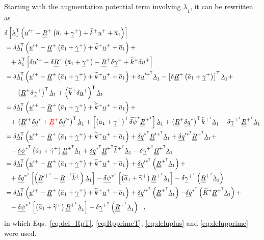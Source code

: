 \documentclass[12pt,a4paper,oneside,english]{abntex2} %
\newcommand{\fix}[1]{{\color{red}#1}}
\newcommand{\vect}[1]{\underline{#1}}
\newcommand{\uvec}[1]{\overline{#1}}
\def\tens#1{\underline{\underline{#1}}}
\def\til#1{\widetilde{#1}}
\def\lb{\left[}
\def\rb{\right]}
\def\lp{\left(}
\def\rp{\right)}
\def\T{\mathsf{T}}
\def\aone{\uvec{a}_1}
\def\aonetil{\til{a}_1}
\def\R{\tens{R}}
\def\Rp{\R^+}
\def\RpT{\R^{+^\T}}
\def\Rpprime{\R^{\prime +}}
\def\RpprimeT{\R^{{\prime +}^\T}}
\def\u{\vect{u}}
\def\uplus{\u^{+}}
\def\upprime{\u^{\prime+}}
\def\upprimeT{\u^{\prime+^\T}}
\def\gam{\vect{\gamma}}
\def\gamp{\gam^{+}}
\def\gampT{\gam^{+^\T}}
\def\gamptil{\til{\gamma}^{+}}
\def\ktil{\til{k}}
\def\ktilp{\ktil^{+}}
\def\ktilpT{\ktil^{+^\T}}
\def\Ktil{\til{K}}
\def\Ktils{\Ktil^{*}}
\def\delq{\vect{\delta q}}
\def\delqs{\delq^*}
\def\delqsT{\delq^{*^\T}}
\def\delqps{\delq^{\prime*}}
\def\delqpsT{\delq^{{\prime*}^\T}}
\def\delpsi{\vect{\delta\psi}}
\def\delpsisT{\delpsi^{*^\T}}
\def\delpsitil{\til{\delta\psi}}
\def\delpsitils{\delpsitil^*}
\def\lamb{\vect{\lambda}}
\begin{document}
\begin{apendicesenv}
Starting with the augmentation potential term involving $\lamb_1$, it can be rewritten as
\begin{equation}
    \begin{aligned}
    &\delta\lb\lamb_1^\T\lp\upprime-\Rp\lp\aone+\gamp\rp+\ktilp\uplus+\aone\rp\rb
    \\
    &=\delta\lamb_1^\T \lp \upprime - \Rp\lp\aone+\gamp\rp + \ktilp\uplus + \aone\rp + 
    \\
    &\hphantom{=}+\lamb_1^\T \lb \delta\upprime - \delta\Rp\lp\aone+\gamp\rp - \Rp\delta\gamp + \ktilp\delta\uplus \rb
    \\
    &=\delta\lamb_1^\T\lp\upprime - \Rp\lp\aone+\gamp\rp + \ktilp\uplus + \aone\rp + \delta\upprimeT\lamb_1 -\lb\delta\Rp\lp\aone+\gamp\rp\rb^\T\lamb_1 +
    \\
    &\hphantom{=}-\lp\Rp\delta\gamp\rp^\T\lamb_1 + \lp\ktilp\delta\uplus\rp^\T\lamb_1
    \\
    &=\delta\lamb_1^\T\lp\upprime - \Rp\lp\aone+\gamp\rp + \ktilp\uplus + \aone\rp + 
    \\
    &\hphantom{=}+\lp\Rpprime\delqs+\fix{\Rp}\delqps\rp^\T\lamb_1 + \lb\lp\aone+\gamp\rp^\T\delpsitils\RpT\rb\lamb_1 + \lp\Rp\delqs\rp^\T\ktilpT\lamb_1 - \delta\gampT\RpT\lamb_1
    \\
    &=\delta\lamb_1^\T\lp\upprime - \Rp\lp\aone+\gamp\rp + \ktilp\uplus + \aone\rp +
    \delqsT\RpprimeT\lamb_1 + \delqpsT\RpT\lamb_1 + 
    \\ 
    &\hphantom{=}- \delpsisT\lp\aonetil+\gamptil\rp\RpT\lamb_1 + \delqsT\RpT\ktilpT\lamb_1  - \delta\gampT\RpT\lamb_1
    \\
    &=\delta\lamb_1^\T\lp\upprime - \Rp\lp\aone+\gamp\rp + \ktilp\uplus + \aone\rp + \delqpsT\lp\RpT\lamb_1\rp +
    \\ 
    &\hphantom{=}+\delqsT\lb\lp\RpprimeT-\RpT\ktilp\rp\lamb_1\rb -\delpsisT\lb\lp\aonetil+\gamptil\rp\RpT\lamb_1\rb 
    - \delta\gampT\lp\RpT\lamb_1\rp
    \\
    &=\delta\lamb_1^\T\lp\upprime - \Rp\lp\aone+\gamp\rp + \ktilp\uplus + \aone\rp +
    \delqpsT\lp\RpT\lamb_1\rp \fix{-} \delqsT\lp\Ktils\RpT\lamb_1\rp +
    \\ 
    &\hphantom{=}-\delpsisT\lb\lp\aonetil+\gamptil\rp\RpT\lamb_1\rb - \delta\gampT\lp\RpT\lamb_1\rp \ \ ,
    \label{eq:dellambda1_exp}
    \end{aligned}
\end{equation}
in which Eqs.~\eqref{eq:del_RpT}, \eqref{eq:RpprimeT}, \eqref{eq:deluplus} and \eqref{eq:delupprime} were used. 


\end{apendicesenv}
\end{document}
